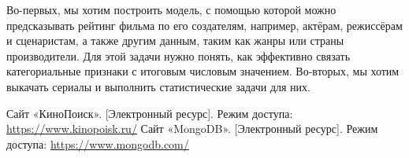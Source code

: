 \documentclass[conference]{IEEEtran}
\begin{document}
Во-первых, мы хотим построить модель, с помощью которой можно предсказывать рейтинг фильма по его создателям, например, актёрам, режиссёрам и сценаристам, а также другим данным, таким как жанры или страны производители. Для этой задачи нужно понять, как эффективно связать категориальные признаки с итоговым числовым значением. Во-вторых, мы хотим выкачать сериалы и выполнить статистические задачи для них.

\begin{thebibliography}{00}
 Сайт «КиноПоиск». [Электронный ресурс]. Режим доступа: \url{https://www.kinopoisk.ru/}
 Сайт «MongoDB». [Электронный ресурс]. Режим доступа: \url{https://www.mongodb.com/}

\end{thebibliography}
\end{document}
